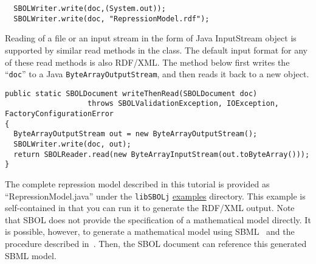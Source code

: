 \vspace{\abovedisplayskip}
\begin{minipage}{0.95\textwidth} 
\begin{lstlisting}
  SBOLWriter.write(doc,(System.out));
  SBOLWriter.write(doc, "RepressionModel.rdf");
\end{lstlisting}
\end{minipage}

Reading of a file or an input stream in the form of Java InputStream
object is supported by similar read methods in the 
class. The default input format for any of these read methods is also
RDF/XML. The method below first writes the 
``\lstinline+doc+'' to a Java \lstinline+ByteArrayOutputStream+,
and then reads it back to a new  object.

\begin{minipage}{0.95\textwidth} 
\begin{lstlisting}
public static SBOLDocument writeThenRead(SBOLDocument doc)
	               throws SBOLValidationException, IOException, FactoryConfigurationError
{
  ByteArrayOutputStream out = new ByteArrayOutputStream();
  SBOLWriter.write(doc, out);
  return SBOLReader.read(new ByteArrayInputStream(out.toByteArray()));
}
\end{lstlisting}
\end{minipage}

The complete repression model described in this tutorial is provided as ``RepressionModel.java'' under the {\tt libSBOLj} \href{https://github.com/SynBioDex/libSBOLj/tree/master/examples/src/main/java/org/sbolstandard/core2/examples}{examples}
directory. This example is self-contained in that you can run it to generate the RDF/XML output. Note that SBOL does not provide the specification of a mathematical model directly. It is possible, however, to generate a mathematical model using SBML~\cite{SBML} and the procedure described in~\cite{roehner2015generating}. Then, the SBOL document can reference this generated SBML model.

